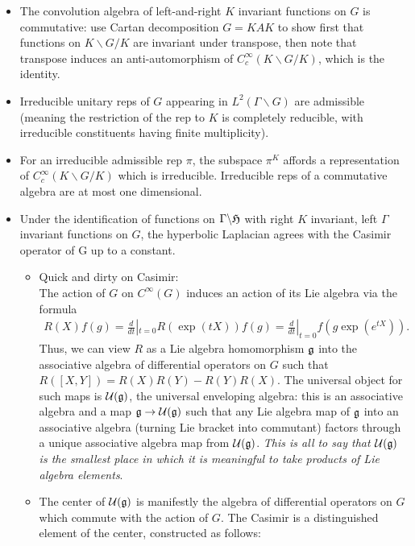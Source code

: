 \documentclass[11pt]{amsart}
\newcommand{\lmod}{\backslash}
\begin{document}
	\begin{itemize}
		\item The convolution algebra of left-and-right $K$ invariant functions on $G$ is commutative: use Cartan decomposition $G=KAK$ to show first that functions on $K\lmod G / K$ are invariant under transpose, then note that transpose induces an anti-automorphism of $C_{c}^{\infty}(K\lmod G/ K)$, which is the identity. 
		\item Irreducible unitary reps of $G$ appearing in $L^{2}(\Gamma \lmod G)$ are admissible (meaning the restriction of the rep to $K$  is completely reducible, with irreducible constituents having finite multiplicity). 
		\item For an irreducible admissible rep $\pi$, the subspace $\pi^{K}$ affords a representation of $C_{c}^{\infty}(K\lmod G / K)$ which is irreducible. Irreducible reps of a commutative algebra are at most one dimensional. 
		\item Under the identification of functions on $\Gamma \lmod \half$ with right $K$ invariant, left $\Gamma$ invariant functions on $G$, the hyperbolic Laplacian agrees with the Casimir operator of G up to a constant. 
			\begin{itemize}
				\item Quick and dirty on Casimir:\\
				 The action of $G$ on $C^{\infty}(G)$ induces an action of its Lie algebra via the formula 
					\begin{align*}
						R(X)f(g)=\frac{d}{dt}|_{t=0} R(\exp(tX))f(g)=\frac{d}{dt}|_{t=0}f(g\exp(e^{tX})). 
					\end{align*}
					Thus, we can view $R$ as a Lie algebra homomorphism $\mathfrak{g}$ into the associative algebra of differential operators on $G$ such that $R([X,Y])=R(X)R(Y)-R(Y)R(X)$. The universal object for such maps is $\mathcal{U} (\mathfrak{g})$, the universal enveloping algebra: this is an associative algebra and a map $\mathfrak{g} \to \mathcal{U}(\mathfrak{g})$ such that any Lie algebra map of $\mathfrak{g}$ into an associative algebra (turning Lie bracket into commutant) factors through a unique associative algebra map from  $\mathcal{U}(\mathfrak{g})$.  \emph{This is all to say that $\mathcal{U}(\mathfrak{g})$ is the smallest place in which it is meaningful to take products of Lie algebra elements}. 
					\item  The center of $\mathcal{U}(\mathfrak{g})$ is manifestly the algebra of differential operators on $G$ which commute with the action of $G$. The Casimir is a distinguished element of the center, constructed as follows:
					\begin{itemize}

\end{itemize}
\end{itemize}
\end{itemize}
\end{document}
